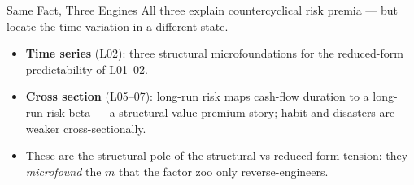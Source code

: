 \documentclass{beamer}
\begin{document}
\begin{frame}{Same Fact, Three Engines}
\justifying
All three explain \alert{countercyclical risk premia} --- but locate the time-variation in a different state.
\begin{center}
\end{center}
\begin{itemize}\small
\item \textbf{Time series} (L02): three structural microfoundations for the reduced-form predictability of L01--02.
\item \textbf{Cross section} (L05--07): long-run risk maps cash-flow \alert{duration} to a long-run-risk beta --- a structural value-premium story; habit and disasters are weaker cross-sectionally.
\item These are the \alert{structural} pole of the structural-vs-reduced-form tension: they \emph{microfound} the $m$ that the factor zoo only reverse-engineers.
\end{itemize}
\end{frame}
\end{document}
